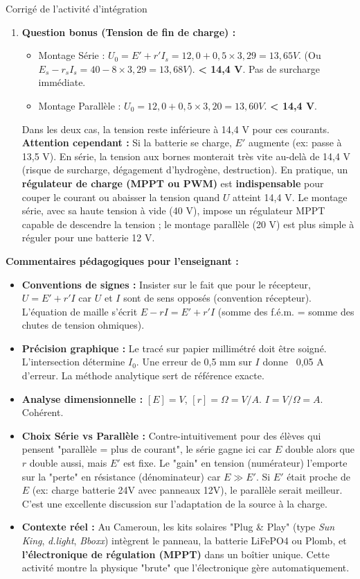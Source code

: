 \documentclass[11pt]{article}
\newcommand{\cle}[1]{{\popxbold\color{popdark}#1}}
\begin{document}
\begin{exoresolu}{Corrigé de l'activité d'intégration}
\begin{enumerate}
    \item \textbf{Question bonus (Tension de fin de charge) :}
    \begin{itemize}
        \item Montage Série : \cle{$U_0 = E' + r' I_s = 12,0 + 0,5 \times 3,29 = 13,65 V$}. (Ou \cle{$E_s - r_s I_s = 40 - 8 \times 3,29 = 13,68 V$}). \textbf{< 14,4 V}. Pas de surcharge immédiate.
        \item Montage Parallèle : \cle{$U_0 = 12,0 + 0,5 \times 3,20 = 13,60 V$}. \textbf{< 14,4 V}.
    \end{itemize}
    Dans les deux cas, la tension reste inférieure à 14,4 V pour ces courants. \textbf{Attention cependant :} Si la batterie se charge, \cle{$E'$} augmente (ex: passe à 13,5 V). En série, la tension aux bornes monterait très vite au-delà de 14,4 V (risque de surcharge, dégagement d'hydrogène, destruction). En pratique, un \textbf{régulateur de charge (MPPT ou PWM)} est \textbf{indispensable} pour couper le courant ou abaisser la tension quand \cle{$U$} atteint 14,4 V. Le montage série, avec sa haute tension à vide (40 V), impose un régulateur MPPT capable de descendre la tension ; le montage parallèle (20 V) est plus simple à réguler pour une batterie 12 V.
\end{enumerate}
\tcblower
\textbf{Commentaires pédagogiques pour l'enseignant :}
\begin{itemize}
    \item \textbf{Conventions de signes :} Insister sur le fait que pour le récepteur, \cle{$U = E' + r'I$} car \cle{$U$} et \cle{$I$} sont de sens opposés (convention récepteur). L'équation de maille s'écrit \cle{$E - rI = E' + r'I$} (somme des f.é.m. = somme des chutes de tension ohmiques).
    \item \textbf{Précision graphique :} Le tracé sur papier millimétré doit être soigné. L'intersection détermine \cle{$I_0$}. Une erreur de 0,5 mm sur \cle{$I$} donne ~0,05 A d'erreur. La méthode analytique sert de référence exacte.
    \item \textbf{Analyse dimensionnelle :} \cle{$[E] = V$}, \cle{$[r] = \Omega = V/A$}. \cle{$I = V/\Omega = A$}. Cohérent.
    \item \textbf{Choix Série vs Parallèle :} Contre-intuitivement pour des élèves qui pensent "parallèle = plus de courant", le série gagne ici car \cle{$E$} double alors que \cle{$r$} double aussi, mais \cle{$E'$} est fixe. Le "gain" en tension (numérateur) l'emporte sur la "perte" en résistance (dénominateur) car \cle{$E \gg E'$}. Si \cle{$E'$} était proche de \cle{$E$} (ex: charge batterie 24V avec panneaux 12V), le parallèle serait meilleur. C'est une excellente discussion sur l'adaptation de la source à la charge.
    \item \textbf{Contexte réel :} Au Cameroun, les kits solaires "Plug \& Play" (type \emph{Sun King}, \emph{d.light}, \emph{Bboxx}) intègrent le panneau, la batterie LiFePO4 ou Plomb, et \textbf{l'électronique de régulation (MPPT)} dans un boîtier unique. Cette activité montre la physique "brute" que l'électronique gère automatiquement.
\end{itemize}
\end{exoresolu}
\end{document}
